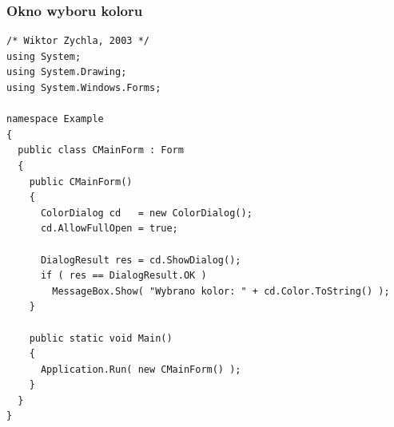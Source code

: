 \subsubsection{Okno wyboru koloru}

\begin{scriptsize}
\begin{verbatim}
/* Wiktor Zychla, 2003 */
using System;
using System.Drawing;
using System.Windows.Forms;

namespace Example
{
  public class CMainForm : Form
  {  
    public CMainForm() 
    {
      ColorDialog cd   = new ColorDialog();
      cd.AllowFullOpen = true;

      DialogResult res = cd.ShowDialog();
      if ( res == DialogResult.OK )
        MessageBox.Show( "Wybrano kolor: " + cd.Color.ToString() );
    }

    public static void Main()
    {    
      Application.Run( new CMainForm() );
    }
  }
}
\end{verbatim}
\end{scriptsize}
